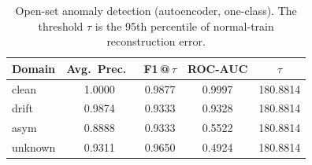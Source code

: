 \begin{table}[t]
\centering
\caption{Open-set anomaly detection (autoencoder, one-class). The threshold $\tau$ is the 95th percentile of normal-train reconstruction error.}
\label{tab:open-set}
\begin{tabular}{lcccc}
\toprule
Domain & Avg.\ Prec.\ & F1\,@\,$\tau$ & ROC-AUC & $\tau$ \\
\midrule
clean & 1.0000 & 0.9877 & 0.9997 & 180.8814 \\
drift & 0.9874 & 0.9333 & 0.9328 & 180.8814 \\
asym & 0.8888 & 0.9333 & 0.5522 & 180.8814 \\
unknown & 0.9311 & 0.9650 & 0.4924 & 180.8814 \\
\bottomrule
\end{tabular}
\end{table}
